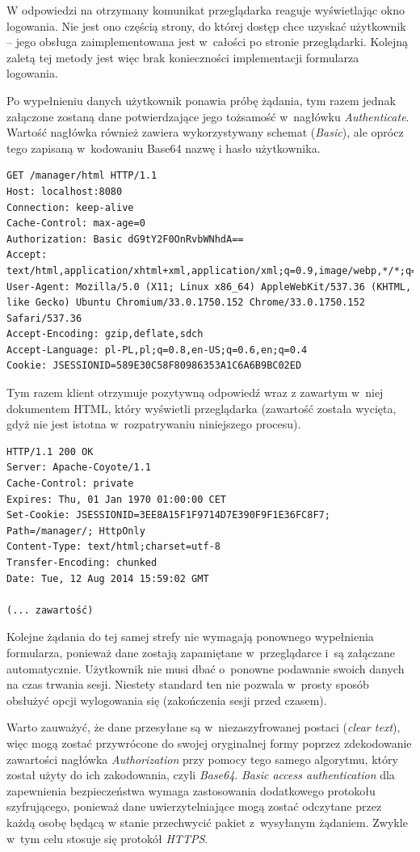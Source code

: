 \documentclass[11pt]{aghdpl}
\begin{document}
W odpowiedzi na otrzymany komunikat przeglądarka reaguje wyświetlając okno logowania. Nie jest ono częścią strony, do której dostęp chce uzyskać użytkownik -- jego obsługa zaimplementowana jest w~całości po stronie przeglądarki. Kolejną zaletą tej metody jest więc brak konieczności implementacji formularza logowania.

Po wypełnieniu danych użytkownik ponawia próbę żądania, tym razem jednak załączone zostaną dane potwierdzające jego tożsamość w~nagłówku \emph{Authenticate}. Wartość nagłówka również zawiera wykorzystywany schemat (\emph{Basic}), ale oprócz tego zapisaną w~kodowaniu Base64 nazwę i hasło użytkownika.

\begin{lstlisting}
GET /manager/html HTTP/1.1
Host: localhost:8080
Connection: keep-alive
Cache-Control: max-age=0
Authorization: Basic dG9tY2F0OnRvbWNhdA==
Accept: text/html,application/xhtml+xml,application/xml;q=0.9,image/webp,*/*;q=0.8
User-Agent: Mozilla/5.0 (X11; Linux x86_64) AppleWebKit/537.36 (KHTML, like Gecko) Ubuntu Chromium/33.0.1750.152 Chrome/33.0.1750.152 Safari/537.36
Accept-Encoding: gzip,deflate,sdch
Accept-Language: pl-PL,pl;q=0.8,en-US;q=0.6,en;q=0.4
Cookie: JSESSIONID=589E30C58F80986353A1C6A6B9BC02ED
\end{lstlisting}

Tym razem klient otrzymuje pozytywną odpowiedź wraz z zawartym w~niej dokumentem HTML, który wyświetli przeglądarka (zawartość została wycięta, gdyż nie jest istotna w~rozpatrywaniu niniejszego procesu).
\begin{lstlisting}
HTTP/1.1 200 OK
Server: Apache-Coyote/1.1
Cache-Control: private
Expires: Thu, 01 Jan 1970 01:00:00 CET
Set-Cookie: JSESSIONID=3EE8A15F1F9714D7E390F9F1E36FC8F7; Path=/manager/; HttpOnly
Content-Type: text/html;charset=utf-8
Transfer-Encoding: chunked
Date: Tue, 12 Aug 2014 15:59:02 GMT

(... zawartość)
\end{lstlisting}

Kolejne żądania do tej samej strefy nie wymagają ponownego wypełnienia formularza, ponieważ dane zostają zapamiętane w~przeglądarce i~są załączane automatycznie. Użytkownik nie musi dbać o~ponowne podawanie swoich danych na czas trwania sesji. Niestety standard ten nie pozwala w~prosty sposób obsłużyć opcji wylogowania się (zakończenia sesji przed czasem).

Warto zauważyć, że dane przesyłane są w~niezaszyfrowanej postaci (\emph{clear text}), więc mogą zostać przywrócone do swojej oryginalnej formy poprzez zdekodowanie zawartości nagłówka \emph{Authorization} przy pomocy tego samego algorytmu, który został użyty do ich zakodowania, czyli \emph{Base64}. \emph{Basic access authentication} dla zapewnienia bezpieczeństwa wymaga zastosowania dodatkowego protokołu szyfrującego, ponieważ dane uwierzytelniające mogą zostać odczytane przez każdą osobę będącą w stanie przechwycić pakiet z~wysyłanym żądaniem. Zwykle w~tym celu stosuje się protokół \emph{HTTPS}.
\end{document}
